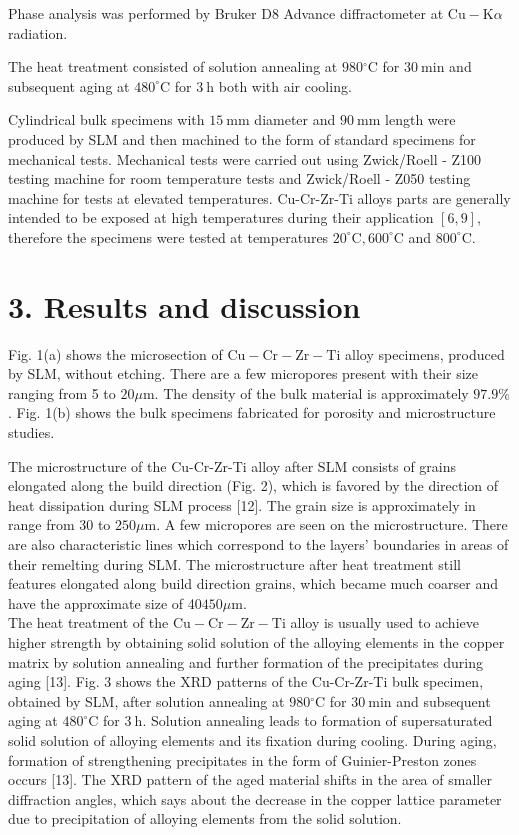 \documentclass[10pt]{article}
\begin{document}
Phase analysis was performed by Bruker D8 Advance diffractometer at $\mathrm{Cu}-\mathrm{K} \alpha$ radiation.

The heat treatment consisted of solution annealing at $980{ }^{\circ} \mathrm{C}$ for $30 \mathrm{~min}$ and subsequent aging at $480^{\circ} \mathrm{C}$ for $3 \mathrm{~h}$ both with air cooling.

Cylindrical bulk specimens with $15 \mathrm{~mm}$ diameter and $90 \mathrm{~mm}$ length were produced by SLM and then machined to the form of standard specimens for mechanical tests. Mechanical tests were carried out using Zwick/Roell - Z100 testing machine for room temperature tests and Zwick/Roell - Z050 testing machine for tests at elevated temperatures. Cu-Cr-Zr-Ti alloys parts are generally intended to be exposed at high temperatures during their application $[6,9]$, therefore the specimens were tested at temperatures $20^{\circ} \mathrm{C}, 600^{\circ} \mathrm{C}$ and $800^{\circ} \mathrm{C}$.

\section*{3. Results and discussion}
Fig. 1(a) shows the microsection of $\mathrm{Cu}-\mathrm{Cr}-\mathrm{Zr}-\mathrm{Ti}$ alloy specimens, produced by SLM, without etching. There are a few micropores present with their size ranging from 5 to $20 \mu \mathrm{m}$. The density of the bulk material is approximately $97.9 \%$. Fig. 1(b) shows the bulk specimens fabricated for porosity and microstructure studies.

The microstructure of the Cu-Cr-Zr-Ti alloy after SLM consists of grains elongated along the build direction (Fig. 2), which is favored by the direction of heat dissipation during SLM process [12]. The grain size is approximately in range from 30 to $250 \mu \mathrm{m}$. A few micropores are seen on the microstructure. There are also characteristic lines which correspond to the layers' boundaries in areas of their remelting during SLM. The microstructure after heat treatment still features elongated along build direction grains, which became much coarser and have the approximate size of 40$450 \mu \mathrm{m}$.\\
The heat treatment of the $\mathrm{Cu}-\mathrm{Cr}-\mathrm{Zr}-\mathrm{Ti}$ alloy is usually used to achieve higher strength by obtaining solid solution of the alloying elements in the copper matrix by solution annealing and further formation of the precipitates during aging [13]. Fig. 3 shows the XRD patterns of the Cu-Cr-Zr-Ti bulk specimen, obtained by SLM, after solution annealing at $980{ }^{\circ} \mathrm{C}$ for $30 \mathrm{~min}$ and subsequent aging at $480^{\circ} \mathrm{C}$ for $3 \mathrm{~h}$. Solution annealing leads to formation of supersaturated solid solution of alloying elements and its fixation during cooling. During aging, formation of strengthening precipitates in the form of Guinier-Preston zones occurs [13]. The XRD pattern of the aged material shifts in the area of smaller diffraction angles, which says about the decrease in the copper lattice parameter due to precipitation of alloying elements from the solid solution.
\end{document}
